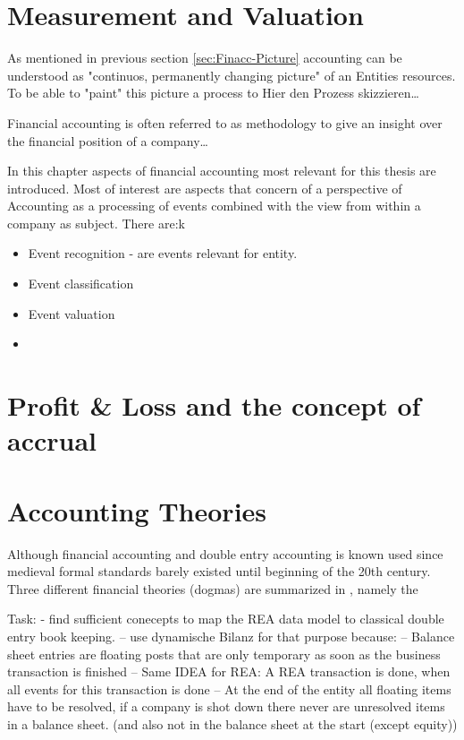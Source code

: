 \section{Measurement and Valuation}




As mentioned in previous section \ref{sec:Finacc-Picture} accounting can be understood as "continuos, permanently changing picture" of an Entities resources.
To be able to "paint" this picture a process to 
Hier den Prozess skizzieren\dots




Financial accounting is often referred to as methodology to give an insight over the financial position of a company\dots


In this chapter aspects of financial accounting most relevant for this thesis are introduced.
Most of interest are aspects that concern of a perspective of Accounting as a processing of events combined with the view from within a company as subject.
There are:k
\begin{itemize}
	\item Event recognition - are events relevant for entity.
	\item Event classification
	\item Event valuation
	\item 
\end{itemize}
\section{Profit \& Loss and the concept of accrual}
\section{Accounting Theories}

Although financial accounting and double entry accounting is known used since medieval formal standards barely existed until beginning of the 20th century.
Three different financial theories (dogmas) are summarized in \cite{moxter1984BilanzlehreI}, namely the 



Task: - find sufficient conecepts to map the REA data model to classical double entry book keeping.
-- use dynamische Bilanz for that purpose because:
-- Balance sheet entries are floating posts that are only temporary as soon as the business transaction is finished
-- Same IDEA for REA: A REA transaction is done, when all events for this transaction is done
-- At the end of the entity all floating items have to be resolved, if a company is shot down there never are unresolved items in a balance sheet. (and also not in the balance sheet at the start (except equity))


